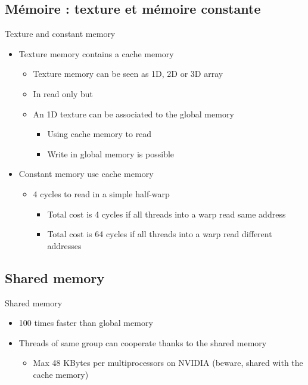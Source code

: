 \documentclass{beamer}
\begin{document}
\subsection{Mémoire : texture et mémoire constante}

\begin{frame}{Texture and constant memory}

\begin{itemize}
\item Texture memory contains a cache memory
  \begin{itemize}
  \item Texture memory can be seen as  1D, 2D or 3D array
  \item In read only \alert{but}
  \item An 1D texture can be associated to the global memory
    \begin{itemize}
    \item Using cache memory to read
    \item Write in global memory is possible
    \end{itemize}
  \end{itemize}
\item Constant memory use cache memory
  \begin{itemize}
  \item 4 cycles to read in a simple half-warp
    \begin{itemize}
    \item Total cost is 4 cycles if all threads into a warp read same address
    \item Total cost is 64 cycles if all threads into a warp read different addresses
    \end{itemize}
  \end{itemize}
\end{itemize}
\end{frame}

\subsection{Shared memory}

\begin{frame}{Shared memory}

\begin{itemize}
\item 100 times faster than global memory
\item Threads of same group can cooperate thanks to the shared memory
  \begin{itemize}
  \item Max 48 KBytes per multiprocessors on NVIDIA (beware, shared with the cache memory)
  \end{itemize}
\end{itemize}
\end{frame}
\end{document}
